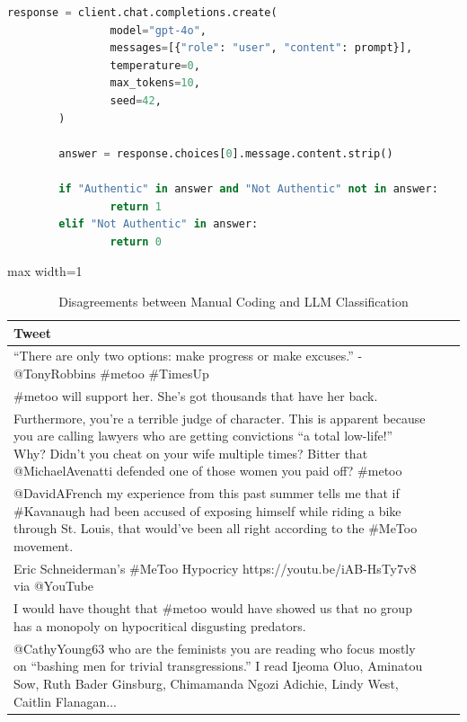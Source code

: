 \documentclass[manuscript,screen,nonacm,11pt,acm]{acmart}
\begin{document}
\begin{bibunit}
\begin{lstlisting}[language=Python, basicstyle=\scriptsize\ttfamily, breaklines=true, frame=single, caption={GPT-4o Classification Prompt}, label={fig:llm-code}, captionpos=t, float=ht]
		response = client.chat.completions.create(
				model="gpt-4o",
				messages=[{"role": "user", "content": prompt}],
				temperature=0,
				max_tokens=10,
				seed=42,
		)
			
		answer = response.choices[0].message.content.strip()
		
		if "Authentic" in answer and "Not Authentic" not in answer:
				return 1
		elif "Not Authentic" in answer:
				return 0
\end{lstlisting}

\begin{table}
	\centering
	\scriptsize
	\caption{Disagreements between Manual Coding and LLM Classification}
	\label{tab:llm-disagreements}
	\begin{adjustbox}{max width=1\textwidth}		
	\begin{tabular}{p{}cc}
	\toprule
	\textbf{Tweet} \\
	\midrule
	``There are only two options: make progress or make excuses.'' - @TonyRobbins \#metoo \#TimesUp \\
	\addlinespace
	\#metoo will support her. She's got thousands that have her back. \\
	\addlinespace
	Furthermore, you're a terrible judge of character. This is apparent because you are calling lawyers who are getting convictions ``a total low-life!'' Why? Didn't you cheat on your wife multiple times? Bitter that @MichaelAvenatti defended one of those women you paid off? \#metoo \\
	\addlinespace
	@DavidAFrench my experience from this past summer tells me that if \#Kavanaugh had been accused of exposing himself while riding a bike through St. Louis, that would've been all right according to the \#MeToo movement. \\
	\addlinespace
	Eric Schneiderman's \#MeToo Hypocricy https://youtu.be/iAB-HsTy7v8 via @YouTube \\
	\addlinespace
	I would have thought that \#metoo would have showed us that no group has a monopoly on hypocritical disgusting predators. \\
	\addlinespace
	@CathyYoung63 who are the feminists you are reading who focus mostly on ``bashing men for trivial transgressions.'' I read Ijeoma Oluo, Aminatou Sow, Ruth Bader Ginsburg, Chimamanda Ngozi Adichie, Lindy West, Caitlin Flanagan... \\
	\bottomrule
	\end{tabular}
	\end{adjustbox}
\end{table}


\end{bibunit}
\end{document}
